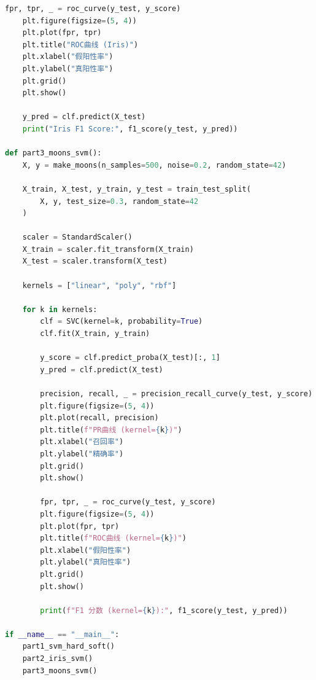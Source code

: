 \documentclass{article}
\begin{document}
\begin{lstlisting}[language=Python]
    fpr, tpr, _ = roc_curve(y_test, y_score)
    plt.figure(figsize=(5, 4))
    plt.plot(fpr, tpr)
    plt.title("ROC曲线 (Iris)")
    plt.xlabel("假阳性率")
    plt.ylabel("真阳性率")
    plt.grid()
    plt.show()

    y_pred = clf.predict(X_test)
    print("Iris F1 Score:", f1_score(y_test, y_pred))

def part3_moons_svm():
    X, y = make_moons(n_samples=500, noise=0.2, random_state=42)

    X_train, X_test, y_train, y_test = train_test_split(
        X, y, test_size=0.3, random_state=42
    )

    scaler = StandardScaler()
    X_train = scaler.fit_transform(X_train)
    X_test = scaler.transform(X_test)

    kernels = ["linear", "poly", "rbf"]

    for k in kernels:
        clf = SVC(kernel=k, probability=True)
        clf.fit(X_train, y_train)

        y_score = clf.predict_proba(X_test)[:, 1]
        y_pred = clf.predict(X_test)

        precision, recall, _ = precision_recall_curve(y_test, y_score)
        plt.figure(figsize=(5, 4))
        plt.plot(recall, precision)
        plt.title(f"PR曲线 (kernel={k})")
        plt.xlabel("召回率")
        plt.ylabel("精确率")
        plt.grid()
        plt.show()

        fpr, tpr, _ = roc_curve(y_test, y_score)
        plt.figure(figsize=(5, 4))
        plt.plot(fpr, tpr)
        plt.title(f"ROC曲线 (kernel={k})")
        plt.xlabel("假阳性率")
        plt.ylabel("真阳性率")
        plt.grid()
        plt.show()

        print(f"F1 分数 (kernel={k}):", f1_score(y_test, y_pred))

if __name__ == "__main__":
    part1_svm_hard_soft()
    part2_iris_svm()
    part3_moons_svm()
\end{lstlisting}
\end{document}
